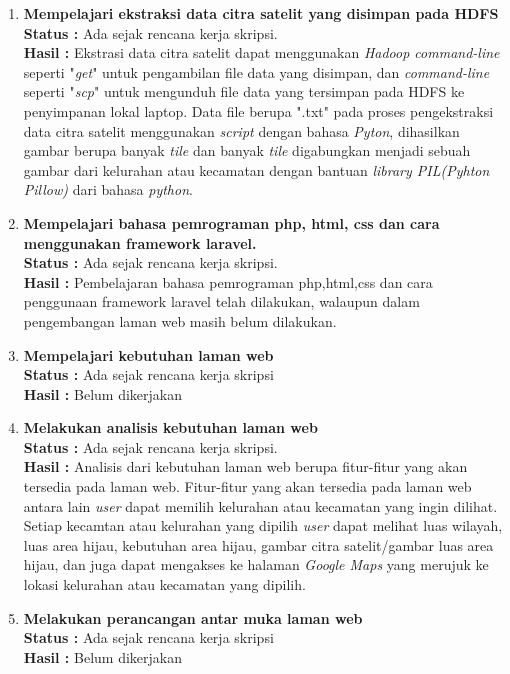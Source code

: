 \documentclass[a4paper,twoside]{article}
\begin{document}
\begin{enumerate}
		\item \textbf{Mempelajari ekstraksi data citra satelit yang disimpan pada HDFS}\\
		{\bf Status :} Ada sejak rencana kerja skripsi.\\
		{\bf Hasil :} Ekstrasi data citra satelit dapat menggunakan \textit{Hadoop command-line} seperti "\textit{get}" untuk pengambilan file data yang disimpan, dan \textit{command-line} seperti "\textit{scp}" untuk mengunduh file data yang tersimpan pada HDFS ke penyimpanan lokal laptop. Data file berupa ".txt" pada proses pengekstraksi data citra satelit menggunakan \textit{script} dengan bahasa \textit{Pyton}, dihasilkan gambar berupa banyak \textit{tile} dan banyak \textit{tile} digabungkan menjadi sebuah gambar dari kelurahan atau kecamatan dengan bantuan \textit{library PIL(Pyhton Pillow)} dari bahasa \textit{python}.

		\item \textbf{Mempelajari bahasa pemrograman php, html, css dan cara menggunakan framework laravel.}\\
		{\bf Status :} Ada sejak rencana kerja skripsi.\\
		{\bf Hasil :} Pembelajaran bahasa pemrograman php,html,css dan cara penggunaan framework laravel telah dilakukan, walaupun dalam pengembangan laman web masih belum dilakukan.

		\item \textbf{ Mempelajari kebutuhan laman web}\\
		{\bf Status :} Ada sejak rencana kerja skripsi \\
		{\bf Hasil :} Belum dikerjakan

		\item \textbf{Melakukan analisis kebutuhan laman web} \\
		{\bf Status :} Ada sejak rencana kerja skripsi.\\
		{\bf Hasil :} Analisis dari kebutuhan laman web berupa fitur-fitur yang akan tersedia pada laman web. Fitur-fitur yang akan tersedia pada laman web antara lain \textit{user} dapat memilih kelurahan atau kecamatan yang ingin dilihat. Setiap kecamtan atau kelurahan yang dipilih \textit{user} dapat melihat luas wilayah, luas area hijau, kebutuhan area hijau, gambar citra satelit/gambar luas area hijau, dan juga dapat mengakses ke halaman \textit{Google Maps} yang merujuk ke lokasi kelurahan atau kecamatan yang dipilih.

		\item \textbf{ Melakukan perancangan antar muka laman web}\\
		{\bf Status :} Ada sejak rencana kerja skripsi \\
		{\bf Hasil :} Belum dikerjakan


\end{enumerate}
\end{document}
